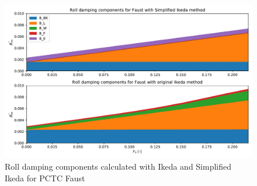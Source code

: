 \begin{figure}[h]
    \centering
    \includegraphics[height=7cm, width=14cm]{figures/ikeda_vs_simplified.pdf}
    \caption{Roll damping components calculated with Ikeda and Simplified Ikeda for PCTC Faust}
    \label{fig:ikeda_vs_simplified}
\end{figure}


